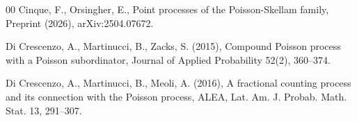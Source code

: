 \documentclass[12pt, twoside, english, headsepline]{article}
\theoremstyle{definition} %
\numberwithin{equation}{section} %
\begin{document}
{\begin{thebibliography}{00}
Cinque, F., Orsingher, E., Point processes of the Poisson-Skellam family, Preprint (2026), arXiv:2504.07672.
%
%
%
%

Di Crescenzo, A., Martinucci, B., Zacks, S. (2015), Compound Poisson process with a Poisson subordinator, Journal of Applied Probability 52(2), 360--374.

Di Crescenzo, A., Martinucci, B., Meoli, A. (2016), A fractional counting process and its connection with the Poisson process, ALEA, Lat. Am. J. Probab. Math. Stat. 13, 291--307.





\end{thebibliography}}
\end{document}
